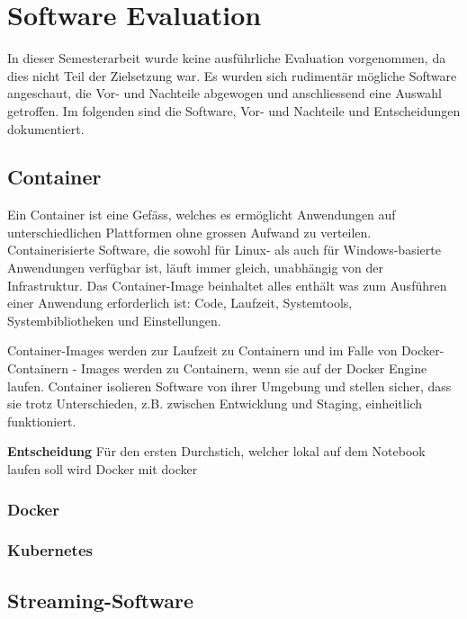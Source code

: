 \chapter{Software Evaluation}
\label{chap:data_collection}

In dieser Semesterarbeit wurde keine ausführliche Evaluation vorgenommen, da dies nicht Teil der Zielsetzung war. Es wurden sich rudimentär mögliche Software angeschaut, die Vor- und Nachteile abgewogen und anschliessend eine Auswahl getroffen. Im folgenden sind die Software, Vor- und Nachteile und Entscheidungen dokumentiert.

\section{Container}
\label{sec:container}

Ein Container ist eine Gef{\"a}ss, welches es erm{\"o}glicht Anwendungen auf unterschiedlichen Plattformen ohne grossen Aufwand zu verteilen. Containerisierte Software, die sowohl f{\"u}r Linux- als auch f{\"u}r Windows-basierte Anwendungen verf{\"u}gbar ist, l{\"a}uft immer gleich, unabh{\"a}ngig von der Infrastruktur. Das Container-Image beinhaltet alles enth{\"a}lt was zum Ausf{\"u}hren einer Anwendung erforderlich ist: Code, Laufzeit, Systemtools, Systembibliotheken und Einstellungen.

Container-Images werden zur Laufzeit zu Containern und im Falle von Docker-Containern - Images werden zu Containern, wenn sie auf der Docker Engine laufen. Container isolieren Software von ihrer Umgebung und stellen sicher, dass sie trotz Unterschieden, z.B. zwischen Entwicklung und Staging, einheitlich funktioniert.

\textbf{Entscheidung}
Für den ersten Durchstich, welcher lokal auf dem Notebook laufen soll wird Docker mit docker 


\subsection{Docker}
\label{sec:Docker}

\subsection{Kubernetes}
\label{sec:Kubernetes}


\section{Streaming-Software}
\label{sec:streaming}

